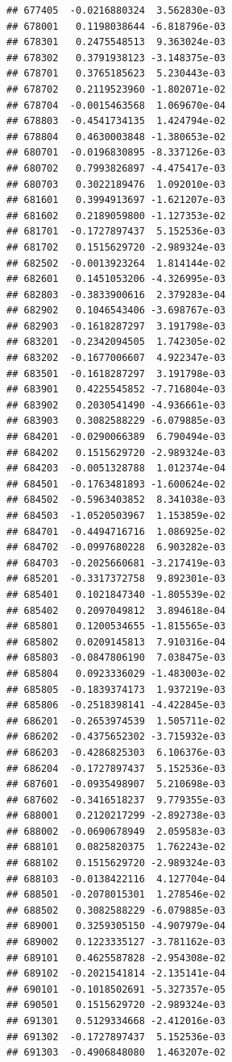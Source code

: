 \begin{frame}[fragile]
\begin{verbatim}
## 677405  -0.0216880324  3.562830e-03
## 678001   0.1198038644 -6.818796e-03
## 678301   0.2475548513  9.363024e-03
## 678302   0.3791938123 -3.148375e-03
## 678701   0.3765185623  5.230443e-03
## 678702   0.2119523960 -1.802071e-02
## 678704  -0.0015463568  1.069670e-04
## 678803  -0.4541734135  1.424794e-02
## 678804   0.4630003848 -1.380653e-02
## 680701  -0.0196830895 -8.337126e-03
## 680702   0.7993826897 -4.475417e-03
## 680703   0.3022189476  1.092010e-03
## 681601   0.3994913697 -1.621207e-03
## 681602   0.2189059800 -1.127353e-02
## 681701  -0.1727897437  5.152536e-03
## 681702   0.1515629720 -2.989324e-03
## 682502  -0.0013923264  1.814144e-02
## 682601   0.1451053206 -4.326995e-03
## 682803  -0.3833900616  2.379283e-04
## 682902   0.1046543406 -3.698767e-03
## 682903  -0.1618287297  3.191798e-03
## 683201  -0.2342094505  1.742305e-02
## 683202  -0.1677006607  4.922347e-03
## 683501  -0.1618287297  3.191798e-03
## 683901   0.4225545852 -7.716804e-03
## 683902   0.2030541490 -4.936661e-03
## 683903   0.3082588229 -6.079885e-03
## 684201  -0.0290066389  6.790494e-03
## 684202   0.1515629720 -2.989324e-03
## 684203  -0.0051328788  1.012374e-04
## 684501  -0.1763481893 -1.600624e-02
## 684502  -0.5963403852  8.341038e-03
## 684503  -1.0520503967  1.153859e-02
## 684701  -0.4494716716  1.086925e-02
## 684702  -0.0997680228  6.903282e-03
## 684703  -0.2025660681 -3.217419e-03
## 685201  -0.3317372758  9.892301e-03
## 685401   0.1021847340 -1.805539e-02
## 685402   0.2097049812  3.894618e-04
## 685801   0.1200534655 -1.815565e-03
## 685802   0.0209145813  7.910316e-04
## 685803  -0.0847806190  7.038475e-03
## 685804   0.0923336029 -1.483003e-02
## 685805  -0.1839374173  1.937219e-03
## 685806  -0.2518398141 -4.422845e-03
## 686201  -0.2653974539  1.505711e-02
## 686202  -0.4375652302 -3.715932e-03
## 686203  -0.4286825303  6.106376e-03
## 686204  -0.1727897437  5.152536e-03
## 687601  -0.0935498907  5.210698e-03
## 687602  -0.3416518237  9.779355e-03
## 688001   0.2120217299 -2.892738e-03
## 688002  -0.0690678949  2.059583e-03
## 688101   0.0825820375  1.762243e-02
## 688102   0.1515629720 -2.989324e-03
## 688103  -0.0138422116  4.127704e-04
## 688501  -0.2078015301  1.278546e-02
## 688502   0.3082588229 -6.079885e-03
## 689001   0.3259305150 -4.907979e-04
## 689002   0.1223335127 -3.781162e-03
## 689101   0.4625587828 -2.954308e-02
## 689102  -0.2021541814 -2.135141e-04
## 690101  -0.1018502691 -5.327357e-05
## 690501   0.1515629720 -2.989324e-03
## 691301   0.5129334668 -2.412016e-03
## 691302  -0.1727897437  5.152536e-03
## 691303  -0.4906848080  1.463207e-02

\end{verbatim}
\end{frame}
